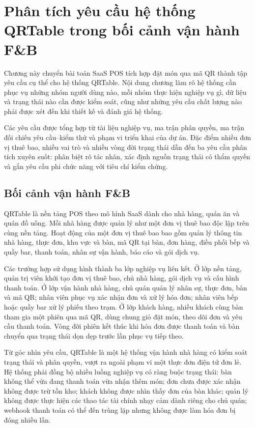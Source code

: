 \chapter{Phân tích yêu cầu hệ thống QRTable trong bối cảnh vận hành F\&B}

Chương này chuyển bài toán SaaS POS tích hợp đặt món qua mã QR thành tập yêu cầu cụ thể cho hệ thống QRTable. Nội dung chương làm rõ hệ thống cần phục vụ những nhóm người dùng nào, mỗi nhóm thực hiện nghiệp vụ gì, dữ liệu và trạng thái nào cần được kiểm soát, cũng như những yêu cầu chất lượng nào phải được xét đến khi thiết kế và đánh giá hệ thống.

Các yêu cầu được tổng hợp từ tài liệu nghiệp vụ, ma trận phân quyền, ma trận đối chiếu yêu cầu–kiểm thử và phạm vi triển khai của dự án. Đặc điểm nhiều đơn vị thuê bao, nhiều vai trò và nhiều vòng đời trạng thái dẫn đến ba yêu cầu phân tích xuyên suốt: phân biệt rõ tác nhân, xác định nguồn trạng thái có thẩm quyền và gắn yêu cầu phi chức năng với tiêu chí kiểm chứng.

\section{Bối cảnh vận hành F\&B}

QRTable là nền tảng POS theo mô hình SaaS dành cho nhà hàng, quán ăn và quán đồ uống. Mỗi nhà hàng được quản lý như một đơn vị thuê bao độc lập trên cùng nền tảng. Hoạt động của một đơn vị thuê bao bao gồm quản lý thông tin nhà hàng, thực đơn, khu vực và bàn, mã QR tại bàn, đơn hàng, điều phối bếp và quầy bar, thanh toán, nhân sự vận hành, báo cáo và gói dịch vụ.

Các trường hợp sử dụng hình thành ba lớp nghiệp vụ liên kết. Ở lớp nền tảng, quản trị viên khởi tạo đơn vị thuê bao, chủ nhà hàng, gói dịch vụ và cấu hình thanh toán. Ở lớp vận hành nhà hàng, chủ quán quản lý nhân sự, thực đơn, bàn và mã QR; nhân viên phục vụ xác nhận đơn và xử lý hóa đơn; nhân viên bếp hoặc quầy bar xử lý phiếu theo trạm. Ở lớp khách hàng, nhiều khách cùng bàn tham gia một phiên qua mã QR, dùng chung giỏ đặt món, theo dõi đơn và yêu cầu thanh toán. Vòng đời phiên kết thúc khi hóa đơn được thanh toán và bàn chuyển qua trạng thái dọn dẹp trước lần phục vụ tiếp theo.

Từ góc nhìn yêu cầu, QRTable là một hệ thống vận hành nhà hàng có kiểm soát trạng thái và phân quyền, vượt ra ngoài phạm vi một thực đơn điện tử đơn lẻ. Hệ thống phải đồng bộ nhiều luồng nghiệp vụ có ràng buộc trạng thái: bàn không thể vừa đang thanh toán vừa nhận thêm món; đơn chưa được xác nhận không được trừ tồn kho; khách không được nhìn thấy đơn của bàn khác; quản lý không được thực hiện các thao tác tài chính nhạy cảm dành riêng cho chủ quán; webhook thanh toán có thể đến trùng lặp nhưng không được làm hóa đơn bị đóng nhiều lần.

